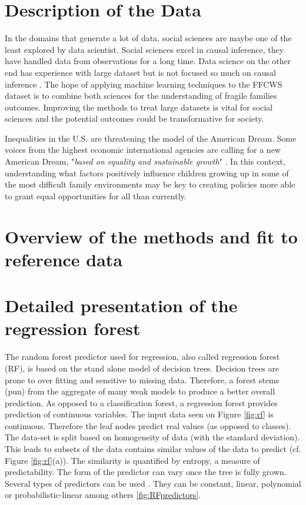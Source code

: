 \documentclass{article} %
\begin{document}
\section{Description of the Data}
In the domains that generate a lot of data, social sciences are maybe one of the least explored by data scientist. Social sciences excel in causal inference, they have handled data from observations for a long time. Data science on the other end has experience with large dataset but is not focused so much on causal inference \cite{grimmer2015we}. The hope of applying machine learning techniques to the FFCWS dataset is to combine both sciences for the understanding of fragile families outcomes. Improving the methods to treat large datasets is vital for social sciences and the potential outcomes could be transformative for society.

Inequalities in the U.S. are threatening the model of the American Dream. Some voices from the highest economic international agencies are calling for a new American Dream, "\textit{based on equality and sustainable growth}" \cite{wef2017}. In this context, understanding what factors positively influence children growing up in some of the most difficult family environments may be key to creating policies more able to grant equal opportunities for all than currently.  


\section{Overview of the methods and fit to reference data}
\section{Detailed presentation of the regression forest}
The random forest predictor used for regression, also called regression forest (RF), is based on the stand alone model of decision trees. Decision trees are prone to over fitting and sensitive to missing data. Therefore, a forest stems (pun) from the aggregate of many weak models to produce a better overall prediction. As opposed to a classification forest, a regression forest provides prediction of continuous variables. The input data seen on Figure \ref{fig:rf} is continuous. Therefore the leaf nodes predict real values (as opposed to classes). The data-set is split based on homogeneity of data (with the standard deviation). This leads to subsets of the data contains similar values of the data to predict (cf. Figure \ref{fig:rf}(a)). The similarity is quantified by entropy, a measure of predictability. The form of the predictor can vary once the tree is fully grown. Several types of predictors can be used \cite{criminisi2011decision}. They can be constant, linear, polynomial or probabilistic-linear among others  \ref{fig:RFpredictors}.
\end{document}
